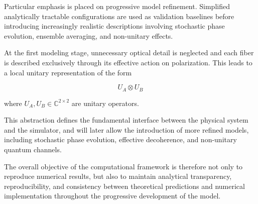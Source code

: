 \medskip

Particular emphasis is placed on progressive model refinement. Simplified analytically tractable configurations are used as validation baselines before introducing increasingly realistic descriptions involving stochastic phase evolution, ensemble averaging, and non-unitary effects.

\medskip

At the first modeling stage, unnecessary optical detail is neglected and each fiber is described exclusively through its effective action on polarization. This leads to a local unitary representation of the form

\begin{equation}
U_A \otimes U_B
\label{eq:local_unitary_evolution}
\end{equation}

where \( U_A, U_B \in \mathbb{C}^{2 \times 2} \) are unitary operators.

\medskip

This abstraction defines the fundamental interface between the physical system and the simulator, and will later allow the introduction of more refined models, including stochastic phase evolution, effective decoherence, and non-unitary quantum channels.

\medskip

The overall objective of the computational framework is therefore not only to reproduce numerical results, but also to maintain analytical transparency, reproducibility, and consistency between theoretical predictions and numerical implementation throughout the progressive development of the model.